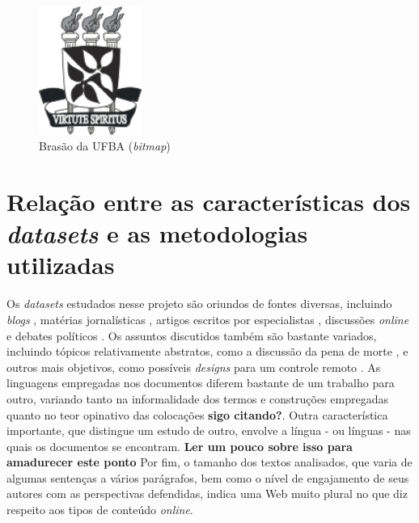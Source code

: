 \begin{figure}
\centering
\includegraphics[width=0.3\textwidth]{brasaoUFBA}
\caption{Brasão da UFBA (\emph{bitmap})}
\label{fig:ufba2}
\end{figure}

\chapter{Relação entre as características dos \emph{datasets} e as metodologias utilizadas}
\label{cap:caracsdatasets}

Os \emph{datasets} estudados nesse projeto são oriundos de fontes diversas, incluindo \emph{blogs} \cite{jiang-argamon} \cite{durant-smith}, matérias jornalísticas \cite{grefenstette-et-al} \cite{schimmelfing-baldwin}, artigos escritos por especialistas \cite{lin-et-al2006} \cite{efrom}, discussões \emph{online} \cite{somasundaran} \cite{wiebe08} e debates políticos \cite{hirst-et-al} \cite{thomas-pang-lee}. Os assuntos discutidos também são bastante variados, incluindo tópicos relativamente abstratos, como a discussão da pena de morte \cite{greeneTESE}, e outros mais objetivos, como possíveis \emph{designs} para um controle remoto \cite{somasundaranGRAPH} \cite{wiebe08}. As linguagens empregadas nos documentos diferem bastante de um trabalho para outro, variando tanto na informalidade dos termos e construções empregadas quanto no teor opinativo das colocações \textbf{sigo citando?}. Outra característica importante, que distingue um estudo de outro, envolve a língua - ou línguas - nas quais os documentos se encontram. \textbf{Ler um pouco sobre isso para amadurecer este ponto} Por fim, o tamanho dos textos analisados, que varia de algumas sentenças a vários parágrafos, bem como o nível de engajamento de seus autores com as perspectivas defendidas, indica uma Web muito plural no que diz respeito aos tipos de conteúdo \emph{online}. 

